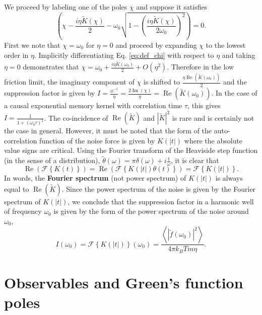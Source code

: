 \documentclass[7pt]{article}
\begin{document}
We proceed by labeling one of the poles $\chi$ and suppose it satisfies
\begin{equation}
	\left(\chi - \frac{i\eta\tilde{K}(\chi)}{2} - \omega_0\sqrt{1-\left(\frac{i\eta\tilde{K}(\chi)}{2\omega_0}\right)^2}\right)=0. \label{eq:def_chi}
\end{equation}
First we note that $\chi=\omega_0$ for $\eta=0$ and proceed by expanding $\chi$ to the lowest order in $\eta$. Implicitly differentiating Eq. \ref{eq:def_chi} with respect to $\eta$ and taking $\eta=0$ demonstrates that $\chi = \omega_0 + \frac{i\eta\tilde{K}(\omega_0)}{2} + O(\eta^2)$. Therefore in the low friction limit, the imaginary component of $\chi$ is shifted to $\frac{\eta\operatorname{Re}(\tilde{K}(\omega_0))}{2}$ and the suppression factor is given by $I=\frac{\phi^{-1}}{\eta}=\frac{2\operatorname{Im}(\chi)}{\eta}=\operatorname{Re}(\tilde{K}(\omega_0))$. In the case of a causal exponential memory kernel with correlation time $\tau$, this gives $I=\frac{1}{1+(\omega_0\tau)^2}$. The co-incidence of $\operatorname{Re}(\tilde{K})$ and $\left|\tilde{K}\right|^2$ is rare and is certainly not the case in general. However, it must be noted that the form of the auto-correlation function of the noise force is given by $K(\left|t\right|)$ where the absolute value signs are critical. Using the Fourier transform of the Heaviside step function (in the sense of a distribution), $\tilde{\theta}(\omega)=\pi\delta(\omega) + i \frac{1}{\omega}$, it is clear that 
\begin{equation}
	\operatorname{Re}\left(\mathcal{F}\left\{K(t)\right\}\right) = \operatorname{Re}\left(\mathcal{F}\left\{K(\left|t\right|)\theta(t)\right\}\right) = \mathcal{F}\left\{K(\left|t\right|)\right\}. 
\end{equation}
In words, the \textbf{Fourier spectrum} (not power spectrum) of $K(\left|t\right|)$ is always equal to $\operatorname{Re}(\tilde{K})$. Since the power spectrum of the noise is given by the Fourier spectrum of $K(\left|t\right|)$, we conclude that the suppression factor in a harmonic well of frequency $\omega_0$ is given by the form of the power spectrum of the noise around $\omega_0$,
\begin{equation}
	I\left(\omega_0\right) = \mathcal{F}\left\{K(\left|t\right|)\right\}(\omega_0) = \frac{\left<|\tilde{f}(\omega_0)|^2\right>}{4 \pi k_BTm\eta}. 
\end{equation}

\section{Observables and Green's function poles}
\end{document}
